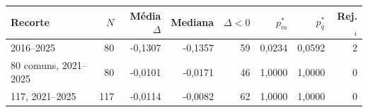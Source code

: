 \begin{tabular}{lrrrrrrr}
\toprule
Recorte & $N$ & Média$\Delta$ & Mediana & $\Delta<0$ & $p^*_{m}$ & $p^*_{q}$ & Rej.$_i$\\
\midrule
2016--2025 & 80 & -0,1307 & -0,1357 & 59 & 0,0234 & 0,0592 & 2\\
80 comuns, 2021--2025 & 80 & -0,0101 & -0,0171 & 46 & 1,0000 & 1,0000 & 0\\
117, 2021--2025 & 117 & -0,0114 & -0,0082 & 62 & 1,0000 & 1,0000 & 0\\
\bottomrule
\end{tabular}
